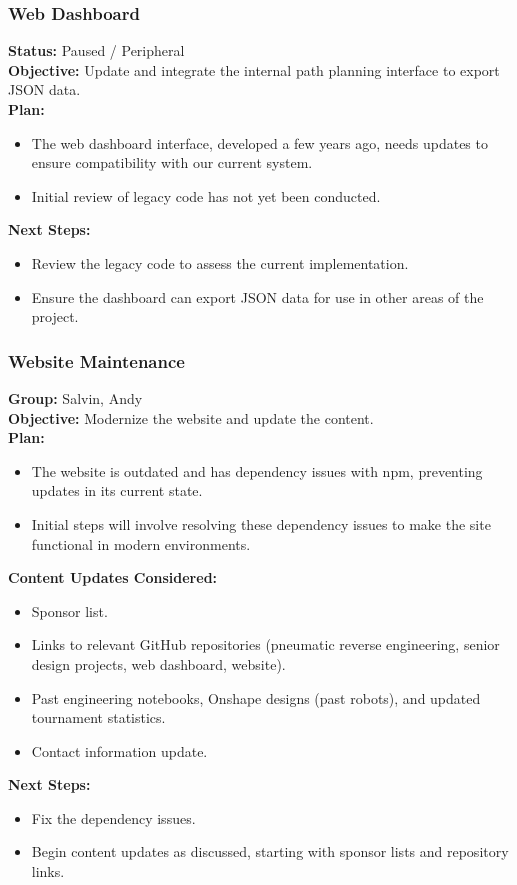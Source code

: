 \subsubsection{Web Dashboard}
\textbf{Status:} Paused / Peripheral\\
\textbf{Objective:} Update and integrate the internal path planning interface to export JSON data.\\
\textbf{Plan:}
\begin{itemize}
  \item The web dashboard interface, developed a few years ago, needs updates to ensure compatibility with our current system.
  \item Initial review of legacy code has not yet been conducted.
\end{itemize}
\textbf{Next Steps:}
\begin{itemize}
  \item Review the legacy code to assess the current implementation.
  \item Ensure the dashboard can export JSON data for use in other areas of the project.
\end{itemize}

\subsubsection{Website Maintenance}
\textbf{Group:} Salvin, Andy\\
\textbf{Objective:} Modernize the website and update the content.\\
\textbf{Plan:}
\begin{itemize}
  \item The website is outdated and has dependency issues with npm, preventing updates in its current state.
  \item Initial steps will involve resolving these dependency issues to make the site functional in modern environments.

\end{itemize}
\textbf{Content Updates Considered:}
\begin{itemize}
  \item Sponsor list.
  \item Links to relevant GitHub repositories (pneumatic reverse engineering, senior design projects, web dashboard, website).
  \item Past engineering notebooks, Onshape designs (past robots), and updated tournament statistics.
  \item Contact information update.
\end{itemize}
\textbf{Next Steps:}
\begin{itemize}
  \item Fix the dependency issues.
  \item Begin content updates as discussed, starting with sponsor lists and repository links.
\end{itemize}
